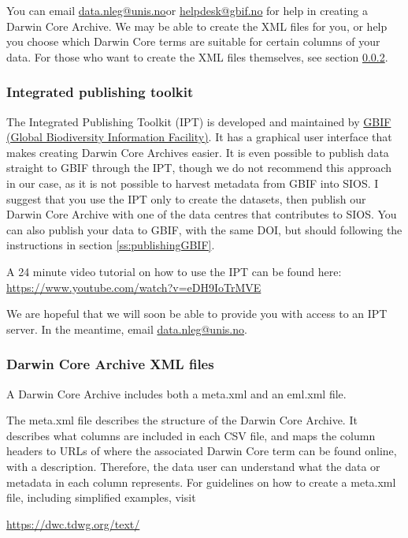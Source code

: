\documentclass[a4paper,english, 11pt]{article}
\makeatletter
\newcommand{\emailme}{\href{mailto:data.nleg@unis.no}{data.nleg@unis.no}}
\makeatother
\begin{document}
You can email \emailme or \href{mailto:helpdesk@gbif.no}{helpdesk@gbif.no} for help in creating a Darwin Core Archive. We may be able to create the XML files for you, or help you choose which Darwin Core terms are suitable for certain columns of your data. For those who want to create the XML files themselves, see section \ref{ss:xml}.

\subsubsection{Integrated publishing toolkit}
\label{ss:ipt}

The Integrated Publishing Toolkit (IPT) is developed and maintained by \href{https://www.gbif.org/}{GBIF (Global Biodiversity Information Facility)}. It has a graphical user interface that makes creating Darwin Core Archives easier. It is even possible to publish data straight to GBIF through the IPT, though we do not recommend this approach in our case, as it is not possible to harvest metadata from GBIF into SIOS. I suggest that you use the IPT only to create the datasets, then publish our Darwin Core Archive with one of the data centres that contributes to SIOS. You can also publish your data to GBIF, with the same DOI, but should following the instructions in section \ref{ss:publishingGBIF}. 

A 24 minute video tutorial on how to use the IPT can be found here:\\ 
\url{https://www.youtube.com/watch?v=eDH9IoTrMVE}

We are hopeful that we will soon be able to provide you with access to an IPT server. In the meantime, email \emailme .

\subsubsection{Darwin Core Archive XML files}
\label{ss:xml}

A Darwin Core Archive includes both a meta.xml and an eml.xml file.

The meta.xml file describes the structure of the Darwin Core Archive. It describes what columns are included in each CSV file, and maps the column headers to URLs of where the associated Darwin Core term can be found online, with a description. Therefore, the data user can understand what the data or metadata in each column represents. For guidelines on how to create a meta.xml file, including simplified examples, visit

\url{https://dwc.tdwg.org/text/}
\end{document}
